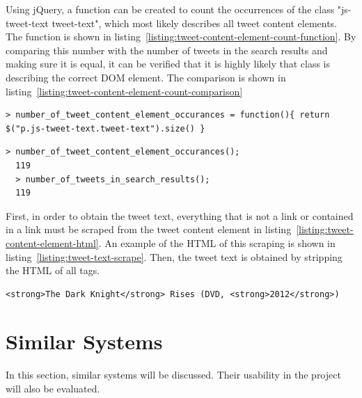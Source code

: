 \noindent
Using jQuery, a function can be created to count the occurrences of the class "js-tweet-text tweet-text", which most likely describes all tweet content elements. The function is shown in listing~\ref{listing:tweet-content-element-count-function}. By comparing this number with the number of tweets in the search results and making sure it is equal, it can be verified that it is highly likely that class is describing the correct DOM element. The comparison is shown in
listing~\ref{listing:tweet-content-element-count-comparison}

\begin{lstlisting}[caption={Creating a function in GCDT JS Console for counting the occurance of tweet content elements on the Twitter search result page},label={listing:tweet-content-element-count-function},captionpos=b]
  > number_of_tweet_content_element_occurances = function(){ return $("p.js-tweet-text.tweet-text").size() }
\end{lstlisting}

\begin{lstlisting}[caption={Running functions in GCDT JS Console to show that the number of tweet content elements matches the number of tweets},label={listing:tweet-content-element-count-comparison},captionpos=b]
  > number_of_tweet_content_element_occurances();
  119
  > number_of_tweets_in_search_results();
  119
\end{lstlisting}

\noindent
First, in order to obtain the tweet text, everything that is not a link or contained in a link must be scraped from the tweet content element in listing~\ref{listing:tweet-content-element-html}. An example of the HTML of this scraping is shown in listing~\ref{listing:tweet-text-scrape}. Then, the tweet text is obtained by stripping the HTML of all tags.

\begin{lstlisting}[caption={The HTML of scraping everything from listing~\ref{listing:tweet-content-element-html} that is not a link},label={listing:tweet-text-scrape},captionpos=b]
  <strong>The Dark Knight</strong> Rises (DVD, <strong>2012</strong>)
\end{lstlisting}



\section{Similar Systems}\label{sec:similarsys}
In this section, similar systems will be discussed. Their usability in the project will also be evaluated.


